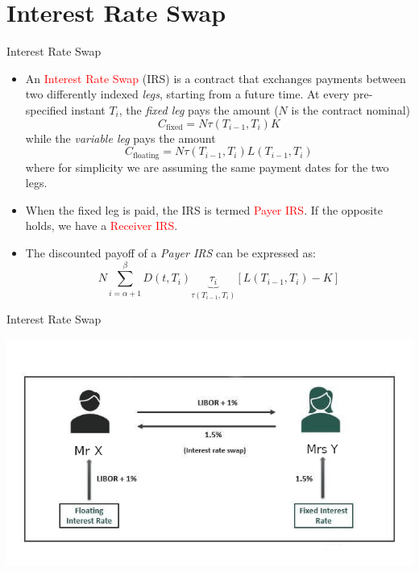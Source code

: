 \documentclass{beamer}
\begin{document}
\section{Interest Rate Swap}
\begin{frame}{Interest Rate Swap}
	\begin{itemize}
		\item An \textcolor{red}{Interest Rate Swap} (IRS) is a contract that exchanges payments between two differently indexed \emph{legs}, starting from a future time. At every pre-specified instant $T_i$, the \emph{fixed leg} pays the amount ($N$ is the contract nominal)
		\begin{equation*}
			C_{\text{fixed}} = N\tau(T_{i-1}, T_i)K
		\end{equation*}
		while the \emph{variable leg} pays the amount
		\begin{equation*}
			C_{\text{floating}} = N\tau(T_{i-1}, T_i)L(T_{i-1}, T_i)
		\end{equation*}
		where for simplicity we are assuming the same payment dates for the two legs.
		\item<2-> When the fixed leg is paid, the IRS is termed \textcolor{red}{Payer IRS}. If the opposite holds, we have a \textcolor{red}{Receiver IRS}.
		\item<3-> The discounted payoff of a \emph{Payer IRS} can be expressed as:
		\begin{equation}
			N\sum_{i=\alpha+1}^{\beta} D(t,T_i) \underbrace{\tau_i}_{\tau(T_{i-1},T_i)}
			\left[L(T_{i-1},T_i)-K\right]
			\label{eq:payoff_payer_irs}
		\end{equation}	
	\end{itemize}
\end{frame}

\begin{frame}{Interest Rate Swap}
\begin{center}
	\includegraphics[width=0.9\linewidth]{images/Interest-Rate-Swap-diagram}
\end{center}
\end{frame}
\end{document}
